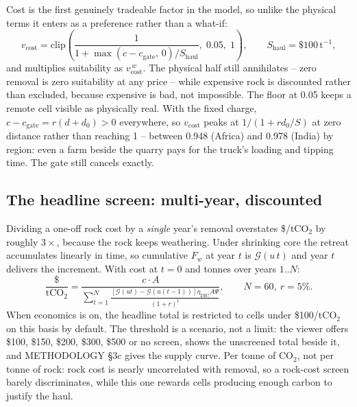 \documentclass[11pt,a4paper]{article}
\newcommand{\cotwo}{\ensuremath{\mathrm{CO_2}}}
\begin{document}
Cost is the first genuinely tradeable factor in the model, so unlike the physical
terms it enters as a preference rather than a what-if:
\begin{equation}
v_{\mathrm{cost}} = \mathrm{clip}\!\left(
\frac{1}{1 + \max(c - c_{\mathrm{gate}},\,0)/S_{\mathrm{haul}}},\;
0.05,\; 1\right),
\qquad S_{\mathrm{haul}} = \$100\,\mathrm{t^{-1}},
\end{equation}
and multiplies suitability as $v_{\mathrm{cost}}^{\,w}$. The physical half still
annihilates -- zero removal is zero suitability at any price -- while expensive
rock is discounted rather than excluded, because expensive is bad, not impossible.
The floor at 0.05 keeps a remote cell visible as physically real.
With the fixed charge, $c - c_{\mathrm{gate}} = r(d + d_0) > 0$ everywhere,
so $v_{\mathrm{cost}}$ peaks at $1/(1 + r d_0/S)$ at zero distance rather
than reaching 1 -- between
0.948
(Africa) and
0.978
(India) by region: even a farm beside the quarry pays for the truck's loading
and tipping time. The gate still cancels exactly.

\subsection{The headline screen: multi-year, discounted}

Dividing a one-off rock cost by a \emph{single} year's removal overstates
\$/t\cotwo{} by roughly $3\times$, because the rock keeps weathering. Under
shrinking core the retreat accumulates linearly in time, so cumulative $F_w$ at
year $t$ is $\mathcal{G}(u\,t)$ and year $t$ delivers the increment. With cost at
$t=0$ and tonnes over years $1..N$:
\begin{equation}
\frac{\$}{\mathrm{t\cotwo{}}}
= \frac{c \cdot A}
       {\displaystyle\sum_{t=1}^{N}
        \frac{\left[\mathcal{G}(ut) - \mathcal{G}(u(t{-}1))\right]
              \eta_{\mathrm{DIC}} A \Psi}{(1+r)^t}},
\qquad N = 60,\ r = 5\% .
\end{equation}
When economics is on, the headline total is restricted to cells under
\$100/t\cotwo{} on this basis by default. The threshold is a
scenario, not a limit: the viewer offers \$100, \$150, \$200, \$300, \$500
or no screen, shows the unscreened total beside it, and METHODOLOGY \S3c gives the
supply curve. Per tonne of \cotwo{},
not per tonne of rock: rock cost is nearly uncorrelated with removal, so a
rock-cost screen barely discriminates, while this one rewards cells producing
enough carbon to justify the haul.
\end{document}
